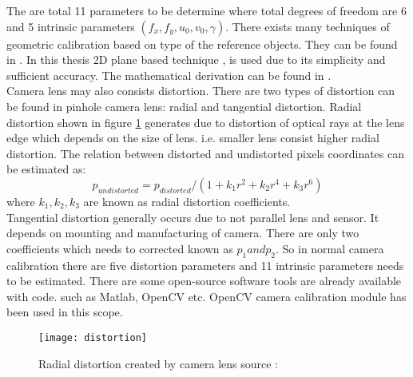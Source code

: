 The are total 11 parameters to be determine where total degrees of freedom are 6 and 5 intrinsic parameters $ (f_{x},f_{y},u_{0},v_{0}, \gamma) $. There exists many techniques of geometric calibration based on type of the reference objects. They can be found in \cite{cameracalib}. In this thesis 2D plane based technique \cite{zhangcalib} ,\cite{sturmcalib} is used due to its simplicity and sufficient accuracy. The mathematical derivation can be found in \cite{cameracalib}.\\
\newline
Camera lens may also consists distortion. There are two types of distortion can be found in pinhole camera lens: radial and tangential distortion. Radial distortion shown in figure \ref{fig:distortion} generates due to distortion of optical rays at the lens edge which depends on the size of lens. i.e. smaller lens consist higher radial distortion. The relation between distorted and undistorted pixels coordinates can be estimated as:
\begin{equation*}
p_{undistorted} = p_{distorted} /(1+ k_{1}r^{2}+k_{2}r^{4}+k_{3}r^{6})
\end{equation*} 
where $ k_{1},k_{2},k_{3} $ are known as radial distortion coefficients.\\
\newline
Tangential distortion generally occurs due to not parallel lens and sensor. It depends on mounting and manufacturing of camera. There are only two coefficients which needs to corrected known as $p_{1} and p_{2} $. So in normal camera calibration there are five distortion parameters and 11 intrinsic parameters needs to be estimated. There are some open-source software tools are already available with code. such as Matlab, OpenCV etc. OpenCV camera calibration module has been used in this scope. 
\begin{figure}[h!]
	\centering
	\texttt{[image: distortion]}
	\caption{Radial distortion created by camera lens source : \cite{opencvcalib}}
	\label{fig:distortion}
\end{figure}

